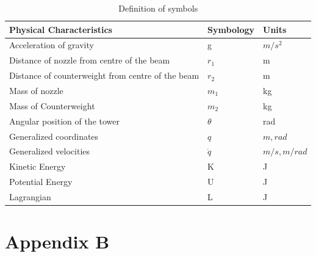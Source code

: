 \documentclass{UoNMCHA}
\numberwithin{equation}{section}
\begin{document}
	\begin{table}[H] \label{tab:physical Characteristics}
		\caption{Definition of symbols}
		\begin{tabular}{lll}
			\textbf{Physical Characteristics}                 & \textbf{Symbology} & \textbf{Units}                              \\ \hline
			Acceleration of gravity                           & g                  & $m/s^2 $     \\
			Distance of nozzle from centre of the beam        &$ r_1 $              & m                                           \\
			Distance of counterweight from centre of the beam & $r_2$               & m                                           \\
			Mass of nozzle                                    & $m_1$               & kg                                          \\
			Mass of Counterweight                             & $m_2 $              & kg                                          \\
			Angular position of the tower                     & $\theta$                  & rad                                         \\
			Generalized coordinates                           & $q$                  & $m,rad$                                     \\
			Generalized velocities                            & $\dot{q}$          & $m/s,m/rad$ \\
			Kinetic Energy                                    & K                  & J                                           \\
			Potential Energy                                  & U                  & J                                           \\
			Lagrangian                                        & L                  & J                                          
		\end{tabular}
	\end{table}
	
	\newpage
	\section{Appendix B}\label{animate}
	
	
	
	
	
\end{document}
